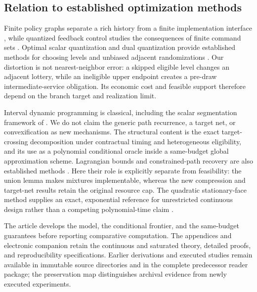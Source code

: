 \subsection{Relation to established optimization methods}\label{sec:r37-position}
Finite policy graphs separate a rich history from a finite implementation interface \citep{Zhang2012}, while quantized feedback control studies the consequences of finite command sets \citep{Fu2024}. Optimal scalar quantization and dual quantization provide established methods for choosing levels and unbiased adjacent randomizations \citep{Wu1991,PagesWilbertz2012,JourdainPages2021}. Our distortion is not nearest-neighbor error: a skipped eligible level changes an adjacent lottery, while an ineligible upper endpoint creates a pre-draw intermediate-service obligation. Its economic cost and feasible support therefore depend on the branch target and realization limit.

Interval dynamic programming is classical, including the scalar segmentation framework of \citet{NielsenNock2014}. We do not claim the generic path recurrence, a target net, or convexification as new mechanisms. The structural content is the exact target-crossing decomposition under contractual timing and heterogeneous eligibility, and its use as a polynomial conditional oracle inside a same-budget global approximation scheme. Lagrangian bounds and constrained-path recovery are also established methods \citep{HandlerZang1980,Lemarechal2001}. Here their role is explicitly separate from feasibility: the union lemma makes mixtures implementable, whereas the new compression and target-net results retain the original resource cap. The quadratic stationary-face method supplies an exact, exponential reference for unrestricted continuous design rather than a competing polynomial-time claim \citep{DelPiaEtAl2017}.

The article develops the model, the conditional frontier, and the same-budget guarantees before reporting comparative computation. The appendices and electronic companion retain the continuous and saturated theory, detailed proofs, and reproducibility specifications. Earlier derivations and executed studies remain available in immutable source directories and in the complete predecessor reader package; the preservation map distinguishes archival evidence from newly executed experiments.

